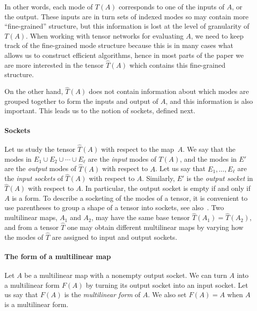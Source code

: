 \documentclass{toc}
\begin{document}
In other words, each mode of $T(A)$ corresponds to one of the inputs
of $A$, or the output.  These inputs are in turn sets of indexed modes
so may contain more ``fine-grained'' structure, but this information
is lost at the level of granularity of $T(A)$.  When working with
tensor networks for evaluating $A$, we need to keep track of the
fine-grained mode structure because this is in many cases what allows
us to construct efficient algorithms, hence in most parts of the paper
we are more interested in the tensor $\hat{T}(A)$ which contains this
fine-grained structure.

On the other hand, $\hat{T}(A)$ does not contain information about
which modes are grouped together to form the inputs and output of $A$,
and this information is also important.  This leads us to the notion
of sockets, defined next.

\paragraph*{Sockets}

Let us study the tensor $\hat{T}(A)$ with respect to the map~$A$.
We say that the modes in
$E_1\cup E_2\cup\cdots\cup E_\ell$ %
are the \emph{input} modes of $\hat{T}(A)$,
and the modes in $E'$ are the \emph{output} modes of $\hat{T}(A)$ with respect to $A$.
Let us say that $E_1, \ldots, E_\ell$ are the
\emph{input sockets} of $\hat{T}(A)$ with respect to $A$. Similarly,
$E'$ is the \emph{output socket} in $\hat{T}(A)$ with respect to $A$.
In particular, the output socket is empty if and only if $A$ is a form. To describe a socketing of the modes of a tensor, it is convenient to
use parentheses to group a 
%
%
%
shape of a tensor
into sockets, see also~.
%
Two multilinear maps, $A_1$ and $A_2$, %
may have the same base tensor $\hat{T}(A_1)=\hat{T}(A_2)$, and from a tensor $\hat{T}$ one may
obtain different multilinear maps by varying how the modes of $\hat{T}$
are assigned to input and output sockets.

\paragraph*{The form of a multilinear map}

Let $A$ be a multilinear map with a nonempty output socket.
We can turn $A$ into a multilinear form $F(A)$ by turning
its output socket into an input socket.
Let us say that $F(A)$ is the \emph{multilinear form} of $A$.
We also set $F(A)=A$ when $A$ is a multilinear form.
\end{document}
